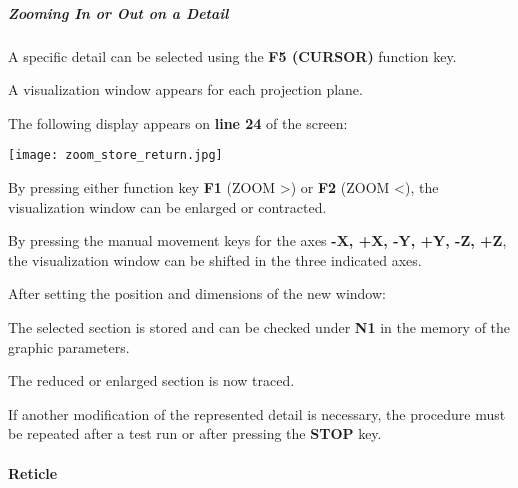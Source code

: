 \subparagraph{Zooming In or Out on a Detail}

A specific detail can be selected using the \textbf{F5 (CURSOR)} function key.

\procedure

\begin{itemize}
\end{itemize}

\vspace{.5cm}

A visualization window appears for each projection plane.

The following display appears on \textbf{line 24} of the screen:

\begin{center}
    \texttt{[image: zoom\_store\_return.jpg]}
\end{center}

By pressing either function key \textbf{F1} (ZOOM >) or \textbf{F2} (ZOOM <), the visualization window can be enlarged or contracted.

By pressing the manual movement keys for the axes \textbf{-X, +X, -Y, +Y, -Z, +Z}, the visualization window can be shifted in the three indicated axes.

After setting the position and dimensions of the new window:

\begin{itemize}
\end{itemize}

\vspace{.5cm}

The selected section is stored and can be checked under \textbf{N1} in the memory of the graphic parameters.

\begin{itemize}
\end{itemize}

\vspace{.5cm}

The reduced or enlarged section is now traced.

\notes

If another modification of the represented detail is necessary, the procedure must be repeated after a test run or after pressing the \textbf{STOP} key.

\paragraph{Reticle}

